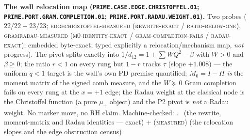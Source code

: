 \documentclass[11pt,a4paper]{article}
\theoremstyle{definition}
\begin{document}
\par\smallskip\noindent\textbf{The wall relocation map
(\texttt{PRIME.CASE.EDGE.\allowbreak CHRISTOFFEL.01};
\texttt{PRIME.PORT.GRAM.\allowbreak COMPLETION.01};
\texttt{PRIME.PORT.RADAU.\allowbreak WEIGHT.01}).}
Two probes ($22/22 + 23/23$; \textsc{edgechristoffel-measured
(rewrite-exact / ratio-below-one)}, \textsc{gramradau-measured
(m0-identity-exact / gram-completion-fails / radau-exact)};
embedded byte-exact; typed explicitly a relocation/mechanism
map, \emph{not} progress).  The pivot splits exactly into
$1/d_{12} = 1 + \sum W Q^2 - \beta$ with $W > 0$ and $\beta \ge
0$; the ratio $r < 1$ on every rung but $1 - r$ tracks $\tau$
(slope $+1.008$) --- the uniform $q < 1$ target is the wall's
own PD premise quantified; $M_0 = I - H$ \emph{is} the moment
matrix of the signed comb measure, and the $W \succeq 0$ Gram
completion fails on every rung at the $x = +1$ edge; the Radau
weight at the classical node is the Christoffel function (a pure
$\mu_+$ object) and the P2 pivot is \emph{not} a Radau weight.
No marker move, no RH claim.
Machine-checked: .
\mE\ (the rewrite, moment-matrix and Radau identities --- exact)
$+$ (\textsc{measured}) (the relocation slopes and the edge
obstruction census)
\par\smallskip
\end{document}
